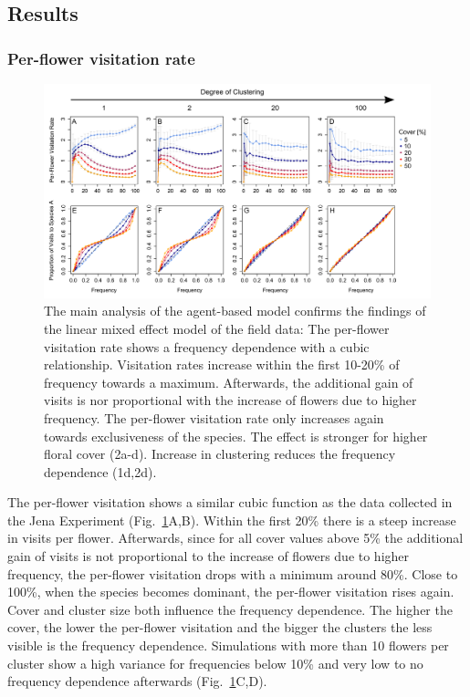 \label{ch:results_model}

\subsection{Results}

\subsubsection*{Per-flower visitation rate}

\begin{figure} [!ht] %
	\centering
	\includegraphics[width=15cm]{Images/PFV}
	\caption{The main analysis of the agent-based model confirms the findings of the linear mixed effect model of the field data: The per-flower visitation rate shows a frequency dependence with a cubic relationship. Visitation rates increase within the first 10-20\% of frequency towards a maximum. Afterwards, the additional gain of visits is nor proportional with the increase of flowers due to higher frequency. The per-flower visitation rate only increases again towards exclusiveness of the species. The effect is stronger for higher floral cover (2a-d). Increase in clustering reduces the frequency dependence (1d,2d).}
	\label{fig:PFV}
\end{figure}


The per-flower visitation shows a similar cubic function as the data collected in the Jena Experiment (Fig.~\ref{fig:PFV}A,B). Within the first 20\% there is a steep increase in visits per flower. Afterwards, since for all cover values above 5\% the additional gain of visits is not proportional to the increase of flowers due to higher frequency, the per-flower visitation drops with a minimum around 80\%. Close to 100\%, when the species becomes dominant, the per-flower visitation rises again. 
Cover and cluster size both influence the frequency dependence. The higher the cover, the lower the per-flower visitation and the bigger the clusters the less visible is the frequency dependence. Simulations with more than 10 flowers per cluster show a high variance for frequencies below 10\% and very low to no frequency dependence afterwards (Fig.~\ref{fig:PFV}C,D). 

